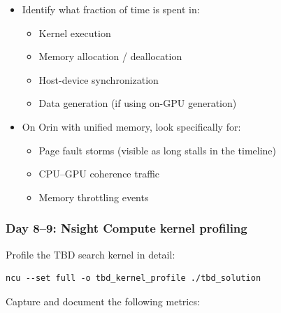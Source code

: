 \documentclass[11pt,letterpaper]{article}
\begin{document}
\begin{itemize}[leftmargin=2em]
    \item Identify what fraction of time is spent in:
    \begin{itemize}
        \item Kernel execution
        \item Memory allocation / deallocation
        \item Host-device synchronization
        \item Data generation (if using on-GPU generation)
    \end{itemize}

    \item On Orin with unified memory, look specifically for:
    \begin{itemize}
        \item Page fault storms (visible as long stalls in the timeline)
        \item CPU--GPU coherence traffic
        \item Memory throttling events
    \end{itemize}
\end{itemize}

\subsubsection{Day 8--9: Nsight Compute kernel profiling}

Profile the TBD search kernel in detail:

\begin{lstlisting}[style=bashstyle]
ncu --set full -o tbd_kernel_profile ./tbd_solution
\end{lstlisting}

Capture and document the following metrics:
\end{document}
